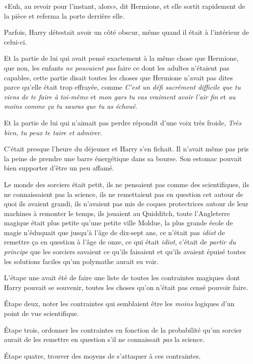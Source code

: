 «Euh, au revoir pour l'instant, alors», dit Hermione, et elle sortit rapidement de la pièce et referma la porte derrière elle.

Parfois, Harry détestait avoir un côté obscur, même quand il était à l'intérieur de celui-ci.

Et la partie de lui qui avait pensé exactement à la même chose que Hermione, que non, les enfants \emph{ne pouvaient pas} faire ce dont les adultes n'étaient pas capables, cette partie disait toutes les choses que Hermione n'avait pas dites parce qu'elle était trop effrayée, comme \emph{C'est un défi sacrément difficile que tu viens de te faire à toi-même} et \emph{mon gars tu vas vraiment avoir l'air fin} et \emph{au moins comme ça tu sauras que tu as échoué}.

Et la partie de lui qui n'aimait pas perdre répondit d'une voix très froide, \emph{Très bien, tu peux te taire et admirer}.

\later

C'était presque l'heure du déjeuner et Harry s'en fichait. Il n'avait même pas pris la peine de prendre une barre énergétique dans sa bourse. Son estomac pouvait bien supporter d'être un peu affamé.

Le monde des sorciers était petit, ils ne pensaient pas comme des scientifiques, ils ne connaissaient pas la science, ils ne remettaient pas en question cet autour de quoi ils avaient grandi, ils n'avaient pas mis de coques protectrices autour de leur machines à remonter le temps, ils jouaient au Quidditch, toute l'Angleterre magique était plus petite qu'une petite ville Moldue, la plus grande école de magie n'éduquait que jusqu'à l'âge de dix-sept ans, ce n'était pas \emph{idiot} de remettre ça en question à l'âge de onze, ce qui était \emph{idiot}, c'était de \emph{partir du principe} que les sorciers savaient ce qu'ils faisaient et qu'ils avaient épuisé toutes les solutions faciles qu'un polymathe aurait su voir.

L'étape une avait été de faire une liste de toutes les contraintes magiques dont Harry pouvait se souvenir, toutes les choses qu'on n'était pas censé pouvoir faire.

Étape deux, noter les contraintes qui semblaient être les \emph{moins} logiques d'un point de vue scientifique.

Étape trois, ordonner les contraintes en fonction de la probabilité qu'un sorcier aurait de les remettre en question s'il ne connaissait \emph{pas} la science.

Étape quatre, trouver des moyens de s'attaquer à ces contraintes.

